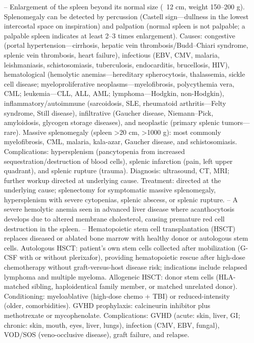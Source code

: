 -- Enlargement of the spleen beyond its normal size (~12 cm, weight 150--200 g). Splenomegaly can be detected by percussion (Castell sign—dullness in the lowest intercostal space on inspiration) and palpation (normal spleen is not palpable; a palpable spleen indicates at least 2--3 times enlargement). Causes: congestive (portal hypertension—cirrhosis, hepatic vein thrombosis/Budd–Chiari syndrome, splenic vein thrombosis, heart failure), infectious (EBV, CMV, malaria, leishmaniasis, schistosomiasis, tuberculosis, endocarditis, brucellosis, HIV), hematological (hemolytic anemias—hereditary spherocytosis, thalassemia, sickle cell disease; myeloproliferative neoplasms—myelofibrosis, polycythemia vera, CML; leukemia—CLL, ALL, AML; lymphoma—Hodgkin, non-Hodgkin), inflammatory/autoimmune (sarcoidosis, SLE, rheumatoid arthritis—Felty syndrome, Still disease), infiltrative (Gaucher disease, Niemann–Pick, amyloidosis, glycogen storage diseases), and neoplastic (primary splenic tumors—rare). Massive splenomegaly (spleen >20 cm, >1000 g): most commonly myelofibrosis, CML, malaria, kala-azar, Gaucher disease, and schistosomiasis. Complications: hypersplenism (pancytopenia from increased sequestration/destruction of blood cells), splenic infarction (pain, left upper quadrant), and splenic rupture (trauma). Diagnosis: ultrasound, CT, MRI; further workup directed at underlying cause. Treatment: directed at the underlying cause; splenectomy for symptomatic massive splenomegaly, hypersplenism with severe cytopenias, splenic abscess, or splenic rupture.
-- A severe hemolytic anemia seen in advanced liver disease where acanthocytosis develops due to altered membrane cholesterol, causing premature red cell destruction in the spleen.
-- Hematopoietic stem cell transplantation (HSCT) replaces diseased or ablated bone marrow with healthy donor or autologous stem cells. Autologous HSCT: patient's own stem cells collected after mobilization (G-CSF with or without plerixafor), providing hematopoietic rescue after high-dose chemotherapy without graft-versus-host disease risk; indications include relapsed lymphoma and multiple myeloma. Allogeneic HSCT: donor stem cells (HLA-matched sibling, haploidentical family member, or matched unrelated donor). Conditioning: myeloablative (high-dose chemo + TBI) or reduced-intensity (older, comorbidities). GVHD prophylaxis: calcineurin inhibitor plus methotrexate or mycophenolate. Complications: GVHD (acute: skin, liver, GI; chronic: skin, mouth, eyes, liver, lungs), infection (CMV, EBV, fungal), VOD/SOS (veno-occlusive disease), graft failure, and relapse.
